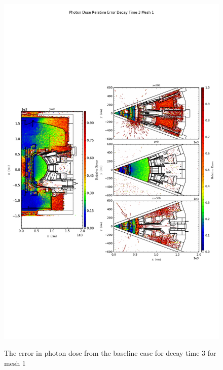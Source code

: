 \begin{figure}[ht!]
\centering
\includegraphics[trim={0cm 9cm 0cm 10cm},clip,scale=0.75]{../plots/final_model_nob4c/Photon_Dose_Relative_Error_Decay_Time_3_Mesh_1.png}
\label{fig:photons_dc3_no4bc_m1_error}
\caption{The error in photon dose from the baseline case for decay time 3 for mesh 1}
\end{figure}

